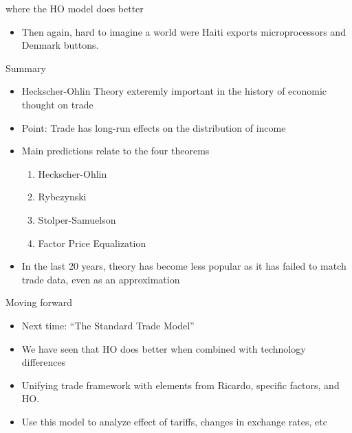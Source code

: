 \documentclass[ignorenonframetext,]{beamer}
\begin{document}
\begin{frame}{where the HO model does better}

    \begin{itemize}
        \item Then again, hard to imagine a world were Haiti exports microprocessors and Denmark buttons.
    \end{itemize}

\end{frame}

\begin{frame}{Summary}
        
        \begin{itemize}
            \item Heckscher-Ohlin Theory exteremly important in the history of economic thought on trade
            \item Point: Trade has long-run effects on the distribution of income
            \item Main predictions relate to the four theorems 
            \begin{enumerate}
                \item Heckscher-Ohlin
                \item Rybczynski
                \item Stolper-Samuelson
                \item Factor Price Equalization
            \end{enumerate}
            \item In the last 20 years, theory has become less popular as it has failed to match trade data, even as an approximation
        \end{itemize}

\end{frame}

\begin{frame}{Moving forward}
        
        \begin{itemize}
            \item Next time: ``The Standard Trade Model''
            \item We have seen that HO does better when combined with technology differences
            \item Unifying trade framework with elements from Ricardo, specific factors, and HO. 
            \item Use this model to analyze effect of tariffs, changes in exchange rates, etc
        \end{itemize}

\end{frame}
\end{document}
